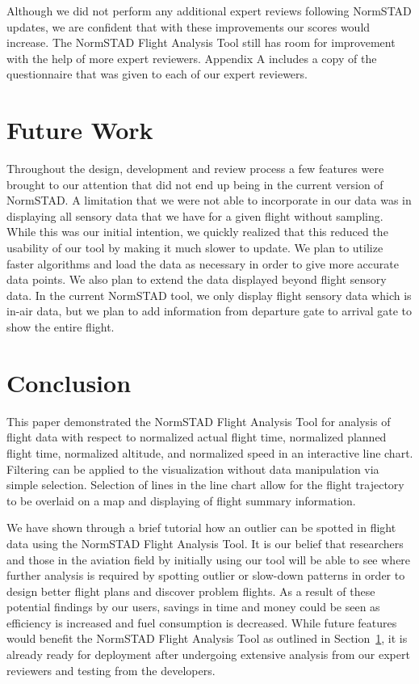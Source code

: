 \documentclass{sig-alternate}
\begin{document}
Although we did not perform any additional expert reviews following 
NormSTAD updates, we are confident that with these improvements our 
scores would increase.
The NormSTAD Flight Analysis Tool still has room for improvement with the help
of more expert reviewers. Appendix A includes a copy of the questionnaire that 
was given to each of our expert reviewers. 
  
	
\section{Future Work}
\label{sec-future-work}

Throughout the design, development and review process a few features were brought to 
our attention that did not end up being in the current version of NormSTAD. 
A limitation that we were not able to incorporate in our data was in displaying
all sensory data that we have for a given flight without sampling. While this was
our initial intention, we quickly realized that this reduced the usability
of our tool by making it much slower to update.
We plan to utilize faster algorithms and load the data as necessary 
in order to give more accurate data points. We also plan
to extend the data displayed beyond flight sensory data. In the current NormSTAD tool, 
we only display flight sensory data which is 
in-air data, but we plan to add information from 
departure gate to arrival gate to show the entire flight. 

\section{Conclusion}
\label{sec-conclusion}

This paper demonstrated the NormSTAD Flight Analysis Tool for analysis of flight data
with respect to normalized actual flight time, normalized planned flight time, normalized
altitude, and normalized speed in an interactive line chart. Filtering can be applied
to the visualization without data manipulation via simple selection. Selection
of lines in the line chart allow for the flight trajectory to be overlaid on a map
and displaying of flight summary information.

We have shown through a brief tutorial how an outlier can be spotted in flight data
using the NormSTAD Flight Analysis Tool.
It is our belief
that researchers and those in the aviation field by initially
using our tool will be able to see where further analysis is required
by spotting outlier or slow-down patterns
in order to design better flight plans and
discover problem flights.
As a result of these potential findings by our users,
savings in time and money could be seen as efficiency is increased and fuel consumption
is decreased. While future features would benefit the NormSTAD Flight Analysis Tool
as outlined in Section~\ref{sec-future-work}, it is already ready for deployment after
undergoing extensive analysis from our expert reviewers and testing from the developers.
\end{document}
